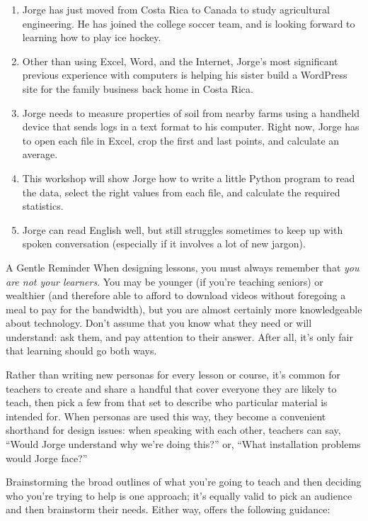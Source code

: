 \begin{enumerate}
\item
  Jorge has just moved from Costa Rica to Canada to study
  agricultural engineering. He has joined the college soccer team,
  and is looking forward to learning how to play ice hockey.
\item
  Other than using Excel, Word, and the Internet, Jorge's most
  significant previous experience with computers is helping his
  sister build a WordPress site for the family business back home in
  Costa Rica.
\item
  Jorge needs to measure properties of soil from nearby farms using a
  handheld device that sends logs in a text format to his computer.
  Right now, Jorge has to open each file in Excel, crop the first and
  last points, and calculate an average.
\item
  This workshop will show Jorge how to write a little Python program
  to read the data, select the right values from each file, and
  calculate the required statistics.
\item
  Jorge can read English well, but still struggles sometimes to keep
  up with spoken conversation (especially if it involves a lot of new
  jargon).
\end{enumerate}

\begin{aside}{A Gentle Reminder}
  When designing lessons, you must always remember that \emph{you are not
    your learners}. You may be younger (if you're teaching seniors) or
  wealthier (and therefore able to afford to download videos without
  foregoing a meal to pay for the bandwidth), but you are almost
  certainly more knowledgeable about technology. Don't assume that you
  know what they need or will understand: ask them, and pay attention
  to their answer. After all, it's only fair that learning should go
  both ways.
\end{aside}

Rather than writing new personas for every lesson or course, it's
common for teachers to create and share a handful that cover everyone
they are likely to teach, then pick a few from that set to describe
who particular material is intended for. When personas are used this
way, they become a convenient shorthand for design issues: when
speaking with each other, teachers can say, ``Would Jorge understand
why we're doing this?'' or, ``What installation problems would Jorge
face?''

Brainstorming the broad outlines of what you're going to teach and
then deciding who you're trying to help is one approach; it's equally
valid to pick an audience and then brainstorm their needs. Either way,
\cite{Guzd2016} offers the following guidance:

